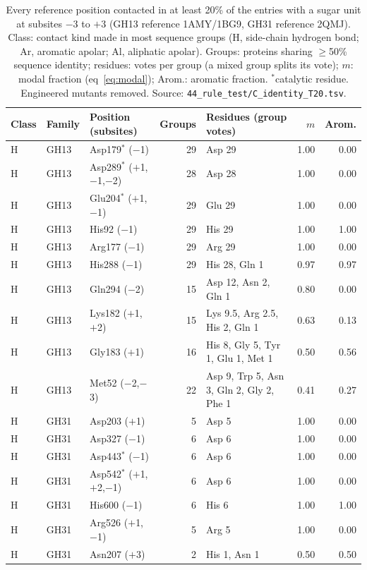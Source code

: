 \begin{table}[h]
\centering\small
\caption{Every reference position contacted in at least 20\% of the entries with a sugar unit at subsites $-3$ to $+3$ (GH13 reference 1AMY/1BG9, GH31 reference 2QMJ). Class: contact kind made in most sequence groups (H, side-chain hydrogen bond; Ar, aromatic apolar; Al, aliphatic apolar). Groups: proteins sharing $\ge$50\% sequence identity; residues: votes per group (a mixed group splits its vote); $m$: modal fraction (eq~\ref{eq:modal}); Arom.: aromatic fraction. $^\ast$catalytic residue. Engineered mutants removed. Source: \texttt{44\_rule\_test/C\_identity\_T20.tsv}.}
\label{tab:rule}
\begin{tabular}{lllrp{4.6cm}rr}
\toprule
Class & Family & Position (subsites) & Groups & Residues (group votes) & $m$ & Arom.\\
\midrule
H & GH13 & Asp179$^\ast$ ($-$1) & 29 & Asp 29 & 1.00 & 0.00\\
H & GH13 & Asp289$^\ast$ ($+$1,$-$1,$-$2) & 28 & Asp 28 & 1.00 & 0.00\\
H & GH13 & Glu204$^\ast$ ($+$1,$-$1) & 29 & Glu 29 & 1.00 & 0.00\\
H & GH13 & His92 ($-$1) & 29 & His 29 & 1.00 & 1.00\\
H & GH13 & Arg177 ($-$1) & 29 & Arg 29 & 1.00 & 0.00\\
H & GH13 & His288 ($-$1) & 29 & His 28, Gln 1 & 0.97 & 0.97\\
H & GH13 & Gln294 ($-$2) & 15 & Asp 12, Asn 2, Gln 1 & 0.80 & 0.00\\
H & GH13 & Lys182 ($+$1,$+$2) & 15 & Lys 9.5, Arg 2.5, His 2, Gln 1 & 0.63 & 0.13\\
H & GH13 & Gly183 ($+$1) & 16 & His 8, Gly 5, Tyr 1, Glu 1, Met 1 & 0.50 & 0.56\\
H & GH13 & Met52 ($-$2,$-$3) & 22 & Asp 9, Trp 5, Asn 3, Gln 2, Gly 2, Phe 1 & 0.41 & 0.27\\
H & GH31 & Asp203 ($+$1) & 5 & Asp 5 & 1.00 & 0.00\\
H & GH31 & Asp327 ($-$1) & 6 & Asp 6 & 1.00 & 0.00\\
H & GH31 & Asp443$^\ast$ ($-$1) & 6 & Asp 6 & 1.00 & 0.00\\
H & GH31 & Asp542$^\ast$ ($+$1,$+$2,$-$1) & 6 & Asp 6 & 1.00 & 0.00\\
H & GH31 & His600 ($-$1) & 6 & His 6 & 1.00 & 1.00\\
H & GH31 & Arg526 ($+$1,$-$1) & 5 & Arg 5 & 1.00 & 0.00\\
H & GH31 & Asn207 ($+$3) & 2 & His 1, Asn 1 & 0.50 & 0.50\\

\end{tabular}
\end{table}
